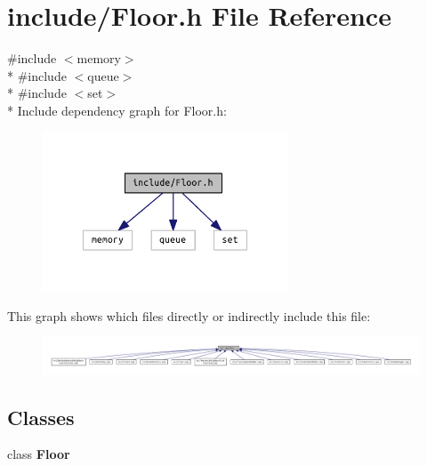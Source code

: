 \section{include/\+Floor.h File Reference}
\label{_floor_8h}
{\ttfamily \#include $<$memory$>$}\\*
{\ttfamily \#include $<$queue$>$}\\*
{\ttfamily \#include $<$set$>$}\\*
Include dependency graph for Floor.\+h\+:\nopagebreak
\begin{figure}[H]
\begin{center}
\leavevmode
\includegraphics[width=206pt]{_floor_8h__incl}
\end{center}
\end{figure}
This graph shows which files directly or indirectly include this file\+:\nopagebreak
\begin{figure}[H]
\begin{center}
\leavevmode
\includegraphics[width=350pt]{_floor_8h__dep__incl}
\end{center}
\end{figure}
\subsection*{Classes}
\begin{DoxyCompactItemize}
\item 
class {\bf Floor}
\end{DoxyCompactItemize}
